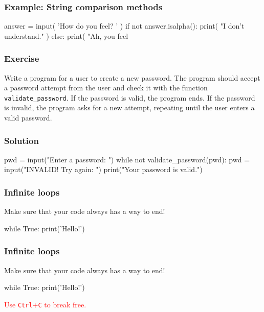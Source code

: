 \documentclass[11pt]{beamer}
\begin{document}
\begin{frame}[fragile]
  \frametitle{Example:  String comparison methods}
  \Enlarge

  \begin{semiverbatim}
answer = input( 'How do you feel?  ' )
if not answer.isalpha():
    print( "I don't understand." )
else:
    print( "Ah, you feel %
  \end{semiverbatim}
\end{frame}

\begin{frame}[fragile]
  \frametitle{Exercise}
  \Enlarge

  Write a program for a user to create a new password.  The program should accept a password attempt from the user and check it with the function \texttt{validate\_password}.  If the password is valid, the program ends.  If the password is invalid, the program asks for a new attempt, repeating until the user enters a valid password.
\end{frame}

\begin{frame}[fragile]
  \frametitle{Solution}
  \Enlarge

  \begin{semiverbatim}
pwd = input("Enter a password:  ")
while not validate_password(pwd):
    pwd = input("INVALID!  Try again:  ")
print("Your password is valid.")
  \end{semiverbatim}
\end{frame}

\begin{frame}[fragile]
  \frametitle{Infinite loops}
  \Enlarge

  \begin{itemize}
  \myitem  Make sure that your code always has a way to end! %
  \begin{semiverbatim}
while True:
    print('Hello!')
  \end{semiverbatim}
  \end{itemize}
\end{frame}

\begin{frame}[fragile]
  \frametitle{Infinite loops}
  \Enlarge

  \begin{itemize}
  \myitem  Make sure that your code always has a way to end!
  \begin{semiverbatim}
while True:
    print('Hello!')
  \end{semiverbatim}
  \myitem  \textcolor{red}{Use \texttt{Ctrl}+\texttt{C} to break free.}
  \end{itemize}
\end{frame}
\end{document}
